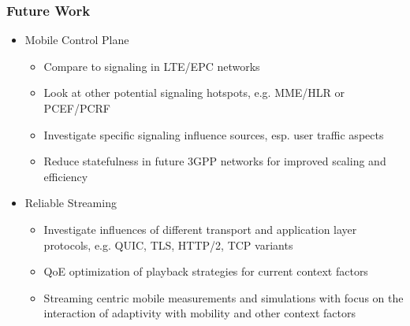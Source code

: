 \documentclass{beamer}
\begin{document}
\begin{frame}
	\frametitle{Future Work}

	\begin{itemize}
		\item Mobile Control Plane
			\begin{itemize}
				\item Compare to signaling in LTE/EPC networks
				\item Look at other potential signaling hotspots, e.g. MME/HLR or PCEF/PCRF
				\item Investigate specific signaling influence sources, esp. user traffic aspects
				\item Reduce statefulness in  future 3GPP networks for improved scaling and efficiency
			\end{itemize}
		\vspace{1em}
		\item Reliable Streaming
		\begin{itemize}
			\item Investigate influences of different transport and application layer protocols, e.g. QUIC, TLS, HTTP/2, TCP variants
			\item QoE optimization of playback strategies for current context factors
			\item Streaming centric mobile measurements and simulations with focus on the interaction of adaptivity with mobility and other context factors
		\end{itemize}
	\end{itemize}

\end{frame}






\end{document}
